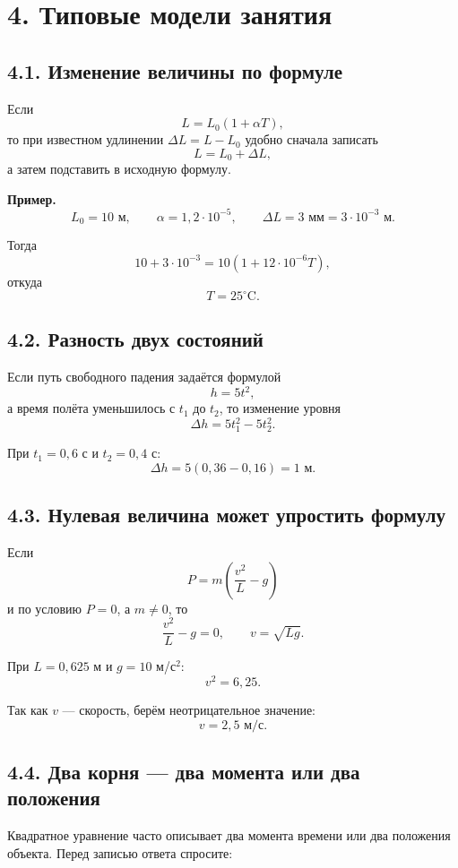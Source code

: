 \documentclass[a4paper,12pt]{article}
\newcommand{\sectionline}{\par\vspace{0.3em}{\color{accent}\hrule height 0.7pt}\vspace{0.7em}}
\begin{document}
\section*{4. Типовые модели занятия}
\sectionline

\subsection*{4.1. Изменение величины по формуле}

Если
\[
L=L_0(1+\alpha T),
\]
то при известном удлинении $\Delta L=L-L_0$ удобно сначала записать
\[
L=L_0+\Delta L,
\]
а затем подставить в исходную формулу.

\textbf{Пример.}
\[
L_0=10\text{ м},
\qquad
\alpha=1{,}2\cdot10^{-5},
\qquad
\Delta L=3\text{ мм}=3\cdot10^{-3}\text{ м}.
\]

Тогда
\[
10+3\cdot10^{-3}
=
10\left(1+12\cdot10^{-6}T\right),
\]
откуда
\[
T=25^{\circ}\text{C}.
\]

\subsection*{4.2. Разность двух состояний}

Если путь свободного падения задаётся формулой
\[
h=5t^2,
\]
а время полёта уменьшилось с $t_1$ до $t_2$, то изменение уровня
\[
\Delta h=5t_1^2-5t_2^2.
\]

При $t_1=0{,}6$ с и $t_2=0{,}4$ с:
\[
\Delta h
=
5(0{,}36-0{,}16)
=
1\text{ м}.
\]

\subsection*{4.3. Нулевая величина может упростить формулу}

Если
\[
P=m\left(\frac{v^2}{L}-g\right)
\]
и по условию $P=0$, а $m\ne0$, то
\[
\frac{v^2}{L}-g=0,
\qquad
v=\sqrt{Lg}.
\]

При $L=0{,}625$ м и $g=10$ м/с$^2$:
\[
v^2=6{,}25.
\]

Так как $v$ --- скорость, берём неотрицательное значение:
\[
v=2{,}5\text{ м/с}.
\]

\subsection*{4.4. Два корня --- два момента или два положения}

Квадратное уравнение часто описывает два момента времени или два положения объекта. Перед записью ответа спросите:
\end{document}

